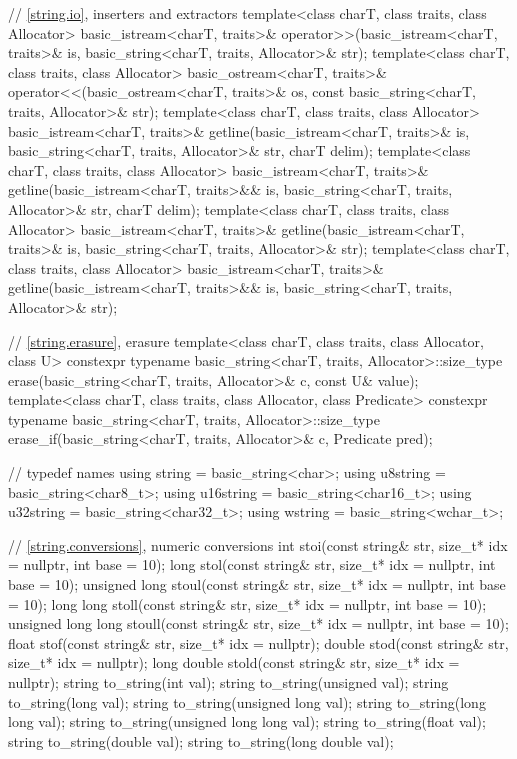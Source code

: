 \begin{codeblock}
{  // \ref{string.io}, inserters and extractors
  template<class charT, class traits, class Allocator>
    basic_istream<charT, traits>&
      operator>>(basic_istream<charT, traits>& is,
                 basic_string<charT, traits, Allocator>& str);
  template<class charT, class traits, class Allocator>
    basic_ostream<charT, traits>&
      operator<<(basic_ostream<charT, traits>& os,
                 const basic_string<charT, traits, Allocator>& str);
  template<class charT, class traits, class Allocator>
    basic_istream<charT, traits>&
      getline(basic_istream<charT, traits>& is,
              basic_string<charT, traits, Allocator>& str,
              charT delim);
  template<class charT, class traits, class Allocator>
    basic_istream<charT, traits>&
      getline(basic_istream<charT, traits>&& is,
              basic_string<charT, traits, Allocator>& str,
              charT delim);
  template<class charT, class traits, class Allocator>
    basic_istream<charT, traits>&
      getline(basic_istream<charT, traits>& is,
              basic_string<charT, traits, Allocator>& str);
  template<class charT, class traits, class Allocator>
    basic_istream<charT, traits>&
      getline(basic_istream<charT, traits>&& is,
              basic_string<charT, traits, Allocator>& str);

  // \ref{string.erasure}, erasure
  template<class charT, class traits, class Allocator, class U>
    constexpr typename basic_string<charT, traits, Allocator>::size_type
      erase(basic_string<charT, traits, Allocator>& c, const U& value);
  template<class charT, class traits, class Allocator, class Predicate>
    constexpr typename basic_string<charT, traits, Allocator>::size_type
      erase_if(basic_string<charT, traits, Allocator>& c, Predicate pred);

  //  typedef names
  using string    = basic_string<char>;
  using u8string  = basic_string<char8_t>;
  using u16string = basic_string<char16_t>;
  using u32string = basic_string<char32_t>;
  using wstring   = basic_string<wchar_t>;

  // \ref{string.conversions}, numeric conversions
  int stoi(const string& str, size_t* idx = nullptr, int base = 10);
  long stol(const string& str, size_t* idx = nullptr, int base = 10);
  unsigned long stoul(const string& str, size_t* idx = nullptr, int base = 10);
  long long stoll(const string& str, size_t* idx = nullptr, int base = 10);
  unsigned long long stoull(const string& str, size_t* idx = nullptr, int base = 10);
  float stof(const string& str, size_t* idx = nullptr);
  double stod(const string& str, size_t* idx = nullptr);
  long double stold(const string& str, size_t* idx = nullptr);
  string to_string(int val);
  string to_string(unsigned val);
  string to_string(long val);
  string to_string(unsigned long val);
  string to_string(long long val);
  string to_string(unsigned long long val);
  string to_string(float val);
  string to_string(double val);
  string to_string(long double val);

}
\end{codeblock}
